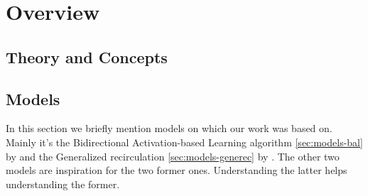 



\section{Overview}
\label{sec:overview} 

\subsection{Theory and Concepts}
\label{sec:theory} 

 



\subsection{Models} %
\label{sec:overview-models}  

In this section we briefly mention models on which our work was based on. Mainly it's the Bidirectional Activation-based Learning algorithm \ref{sec:models-bal} by \citet{farkas2013bal} and the Generalized recirculation \ref{sec:models-generec} by \citet{o1996bio}. The other two models are inspiration for the two former ones. Understanding the latter helps understanding the former. 










 
